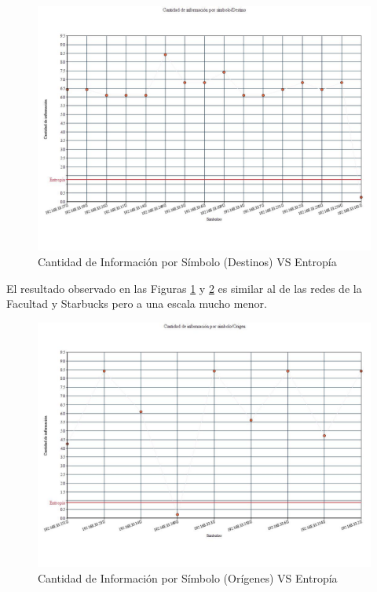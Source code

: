 \begin{figure}[H]
  \centering
    \includegraphics[scale=0.45]{imagenes/graficos/entropiaCantInf/06destino.jpg}
  \caption{Cantidad de Información por Símbolo (Destinos) VS Entropía}
  \label{fig:15}
\end{figure}

El resultado observado en las Figuras \ref{fig:15} y \ref{fig:16} es similar al de las redes de la Facultad y Starbucks pero a una escala mucho menor.

\begin{figure}[H]
  \centering
    \includegraphics[scale=0.45]{imagenes/graficos/entropiaCantInf/06Origen.jpg}
  \caption{Cantidad de Información por Símbolo (Orígenes) VS Entropía}
  \label{fig:16}
\end{figure}

